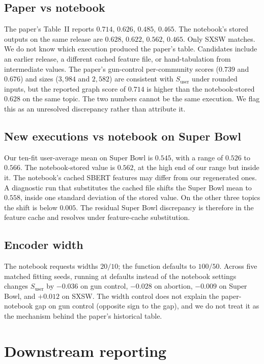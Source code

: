 \subsection{Paper vs notebook}

The paper's Table~II reports $0.714$, $0.626$, $0.485$, $0.465$. The notebook's stored outputs on the same release are $0.628$, $0.622$, $0.562$, $0.465$. Only SXSW matches. We do not know which execution produced the paper's table. Candidates include an earlier release, a different cached feature file, or hand-tabulation from intermediate values. The paper's gun-control per-community scores ($0.739$ and $0.676$) and sizes ($3{,}984$ and $2{,}582$) are consistent with $S_{\mathrm{user}}$ under rounded inputs, but the reported graph score of $0.714$ is higher than the notebook-stored $0.628$ on the same topic. The two numbers cannot be the same execution. We flag this as an unresolved discrepancy rather than attribute it.

\subsection{New executions vs notebook on Super Bowl}

Our ten-fit user-average mean on Super Bowl is $0.545$, with a range of $0.526$ to $0.566$. The notebook-stored value is $0.562$, at the high end of our range but inside it. The notebook's cached SBERT features may differ from our regenerated ones. A diagnostic run that substitutes the cached file shifts the Super Bowl mean to $0.558$, inside one standard deviation of the stored value. On the other three topics the shift is below $0.005$. The residual Super Bowl discrepancy is therefore in the feature cache and resolves under feature-cache substitution.

\subsection{Encoder width}

The notebook requests widths $20/10$; the function defaults to $100/50$. Across five matched fitting seeds, running at defaults instead of the notebook settings changes $S_{\mathrm{user}}$ by $-0.036$ on gun control, $-0.028$ on abortion, $-0.009$ on Super Bowl, and $+0.012$ on SXSW. The width control does not explain the paper-notebook gap on gun control (opposite sign to the gap), and we do not treat it as the mechanism behind the paper's historical table.

\section{Downstream reporting}

